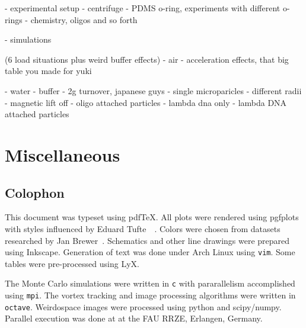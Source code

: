 \documentclass[a4paper,titlepage,onecolumn]{report}
\begin{document}
- experimental setup
 - centrifuge
 - PDMS o-ring, experiments with different o-rings
 - chemistry, oligos and so forth

- simulations

(6 load situations plus weird buffer effects)
- air
 - acceleration effects, that big table you made for yuki

- water
- buffer
 - 2g turnover, japanese guys
- single microparicles
 - different radii
 - magnetic lift off
- oligo attached particles
- lambda dna only
- lambda DNA attached particles


\chapter{Miscellaneous}
\section{Colophon}
This document was typeset using pdf\TeX. All
plots were rendered using pgfplots~\cite{feuersangerpgfplots} with styles influenced by
Eduard Tufte~\cite{tufte1983visual}~\cite{tufte1991envisioning}. Colors were chosen
from datasets researched by Jan Brewer~\cite{harrower2003colorbrewer}.
Schematics and other line drawings were prepared using Inkscape. Generation
of text was done under Arch Linux using \texttt{vim}.  Some tables were
pre-processed using LyX.

The Monte Carlo simulations were written in \texttt{c} with pararallelism
accomplished using \texttt{mpi}. The vortex tracking and image processing
algorithms were written in \texttt{octave}.  Weirdospace images were
processed using python and scipy/numpy.  Parallel execution was done at at
the FAU RRZE, Erlangen, Germany.

\listoftodos
\end{document}
